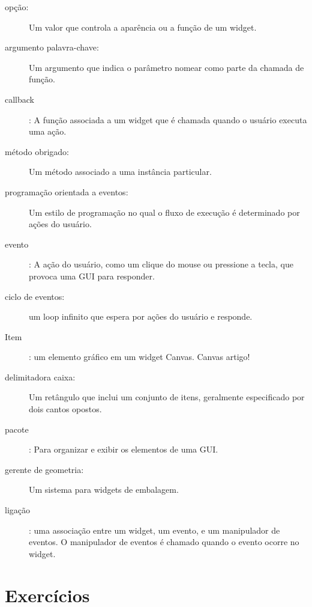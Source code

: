 \documentclass[10pt]{book}
\begin{document}
\begin{exercise}
\begin{v erbatim}
\begin{description}
\item[opção:] Um valor que controla a aparência ou a função de
um widget.

\item[argumento palavra-chave:] Um argumento que indica o parâmetro
nomear como parte da chamada de função.

\item[callback]: A função associada a um widget que é
chamada quando o usuário executa uma ação.

\item[método obrigado:] Um método associado a uma instância particular.

\item[programação orientada a eventos:] Um estilo de programação no qual
o fluxo de execução é determinado por ações do usuário.

\item[evento]: A ação do usuário, como um clique do mouse ou pressione a tecla, que
provoca uma GUI para responder.

\item[ciclo de eventos:] um loop infinito que espera por ações do usuário
e responde.

\item[Item]: um elemento gráfico em um widget Canvas.
{Canvas artigo!} \Index

\item[delimitadora caixa:] Um retângulo que inclui um conjunto de itens,
geralmente especificado por dois cantos opostos.

\item[pacote]: Para organizar e exibir os elementos de uma GUI.

\item[gerente de geometria:] Um sistema para widgets de embalagem.

\item[ligação]: uma associação entre um widget, um evento, e
um manipulador de eventos. O manipulador de eventos é chamado quando o evento
ocorre no widget.

\end{description}


\section{Exercícios}


\end{v erbatim}
\end{exercise}
\end{document}
